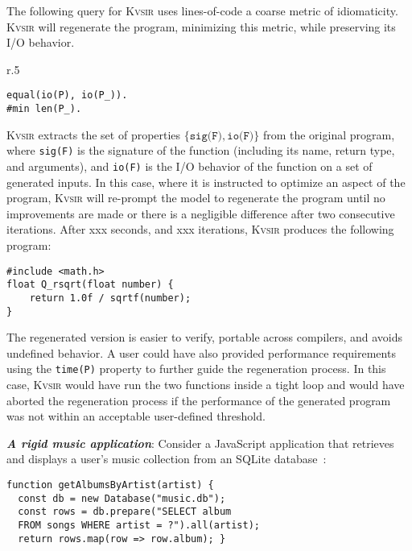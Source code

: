 \documentclass[sigplan]{acmart}
\newcommand{\sys}{{\scshape Kv{\textalpha}sir}\xspace}
\newcommand{\heading}[1]{\vspace{2pt}\noindent\textbf{\emph{#1}}:\enspace}
\newcommand{\ttt}[1]{\texttt{#1}}
\newcommand{\xxx}{\colorbox{red!30}{xxx}\xspace}
\begin{document}
The following query for \sys uses lines-of-code a coarse metric of
idiomaticity. \sys will regenerate the program, minimizing this metric, while
preserving its I/O behavior.
\begin{wrapfigure}[3]{r}{.5\columnwidth}
  \vspace{-5pt}
  \begin{verbatim}
equal(io(P), io(P_)).
#min len(P_).
  \end{verbatim}
\end{wrapfigure}
\sys extracts the set of properties $\{\texttt{sig(F)}, \texttt{io(F)}\}$ from the original program, where \texttt{sig(F)} is the
signature of the function (including its name, return type, and arguments), and \texttt{io(F)} is the I/O behavior of the function
on a set of generated inputs.
In this case, where it is instructed to optimize an aspect of the program, \sys will re-prompt
the model to regenerate the program until no improvements are made or there is a negligible difference after two consecutive iterations.
After \xxx seconds, and \xxx iterations, \sys produces the following program:
\begin{verbatim}
#include <math.h>
float Q_rsqrt(float number) {
    return 1.0f / sqrtf(number);
}
\end{verbatim}
The regenerated version is easier to verify, portable across compilers, and
avoids undefined behavior.
A user could have also provided performance requirements using 
the \ttt{time(P)} property to further guide the regeneration process.
In this case, \sys would have run the two functions inside a tight loop and 
would have aborted the regeneration process if the performance of the generated
program was not within an acceptable user-defined threshold.

\heading{A rigid music application}
Consider a JavaScript application that retrieves and displays a user's music
collection from an SQLite database~\cite{codewithsadeemusicplayer, beets}:

\begin{verbatim}
function getAlbumsByArtist(artist) {
  const db = new Database("music.db");
  const rows = db.prepare("SELECT album
  FROM songs WHERE artist = ?").all(artist);
  return rows.map(row => row.album); }
\end{verbatim}
\end{document}
